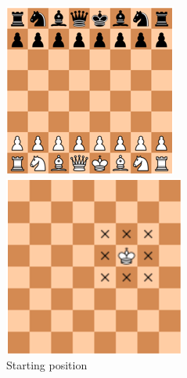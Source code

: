 \documentclass{article}
\begin{document}
\begin{figure}[!htb]
%
  \includegraphics[width=\linewidth]{chess1}
  \caption{Starting position}\label{fig:chess1}
\endminipage\hfill
{}%
  \includegraphics[width=\linewidth]{chess2}

\end{figure}
\end{document}
